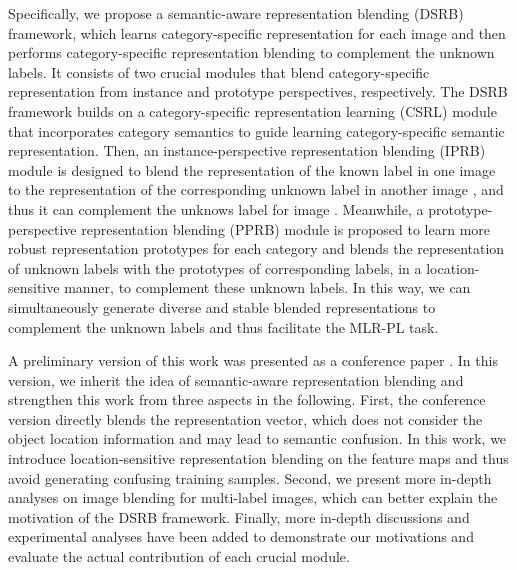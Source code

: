 \documentclass[lettersize,journal]{IEEEtran}
\begin{document}
Specifically, we propose a semantic-aware representation blending (DSRB) framework, which learns category-specific representation for each image and then performs category-specific representation blending to complement the unknown labels. It consists of two crucial modules that blend category-specific representation from instance and prototype perspectives, respectively. The DSRB framework builds on a category-specific representation learning (CSRL) module that incorporates category semantics to guide learning category-specific semantic representation. Then, an instance-perspective representation blending (IPRB) module is designed to blend the representation of the known label  in one image  to the representation of the corresponding unknown label  in another image , and thus it can complement the unknows label  for image . Meanwhile, a prototype-perspective representation blending (PPRB) module is proposed to learn more robust representation prototypes for each category and blends the representation of unknown labels with the prototypes of corresponding labels, in a location-sensitive manner, to complement these unknown labels. In this way, we can simultaneously generate diverse and stable blended representations to complement the unknown labels and thus facilitate the MLR-PL task.

A preliminary version of this work was presented as a conference paper \cite{Pu2022SARB}. In this version, we inherit the idea of semantic-aware representation blending and strengthen this work from three aspects in the following. First, the conference version directly blends the representation vector, which does not consider the object location information and may lead to semantic confusion. In this work, we introduce location-sensitive representation blending on the feature maps and thus avoid generating confusing training samples. Second, we present more in-depth analyses on image blending for multi-label images, which can better explain the motivation of the DSRB framework. Finally, more in-depth discussions and experimental analyses have been added to demonstrate our motivations and evaluate the actual contribution of each crucial module.
\end{document}

